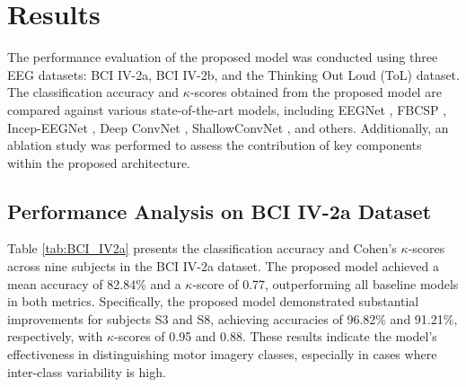 \documentclass[pdflatex,sn-mathphys-num]{sn-jnl}%
\theoremstyle{thmstyleone}%
\theoremstyle{thmstyletwo}%
\theoremstyle{thmstylethree}%
\begin{document}
\section{Results}

The performance evaluation of the proposed model was conducted using three EEG datasets: BCI IV-2a, BCI IV-2b, and the Thinking Out Loud (ToL) \cite{nieto2022thinking} dataset. The classification accuracy and $\kappa$-scores obtained from the proposed model are compared against various state-of-the-art models, including EEGNet \cite{lawhern2018eegnet}, FBCSP \cite{ang2008filter}, Incep-EEGNet \cite{zhang2020inception}, Deep ConvNet \cite{schirrmeister2017deep}, ShallowConvNet \cite{schirrmeister2017deep}, and others. Additionally, an ablation study was performed to assess the contribution of key components within the proposed architecture.

\subsection{Performance Analysis on BCI IV-2a Dataset}

Table \ref{tab:BCI_IV2a} presents the classification accuracy and Cohen's $\kappa$-scores across nine subjects in the BCI IV-2a dataset. The proposed model achieved a mean accuracy of 82.84\% and a $\kappa$-score of 0.77, outperforming all baseline models in both metrics. Specifically, the proposed model demonstrated substantial improvements for subjects S3 and S8, achieving accuracies of 96.82\% and 91.21\%, respectively, with $\kappa$-scores of 0.95 and 0.88. These results indicate the model’s effectiveness in distinguishing motor imagery classes, especially in cases where inter-class variability is high.

\end{document}
